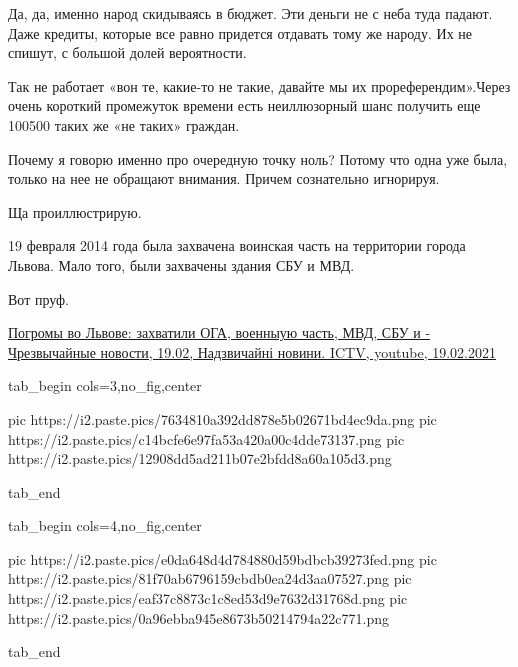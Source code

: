 \begin{multicols}{2}
Да, да, именно народ скидываясь в бюджет. Эти деньги не с неба туда падают.
Даже кредиты, которые все равно придется отдавать тому же народу. Их не спишут,
с большой долей вероятности.

Так не работает «вон те, какие-то не такие, давайте мы их прореферендим».Через
очень короткий промежуток времени есть неиллюзорный шанс получить еще 100500
таких же «не таких» граждан.

Почему я говорю именно про очередную точку ноль? Потому что одна уже была,
только на нее не обращают внимания. Причем сознательно игнорируя.

Ща проиллюстрирую.

19 февраля 2014 года была захвачена воинская часть на территории города Львова.
Мало того, были захвачены здания СБУ и МВД.

Вот пруф.

\end{multicols} %

\href{https://www.youtube.com/watch?v=GQ0Lmm-mTmU}{%
Погромы во Львове: захватили ОГА, военныую часть, МВД, СБУ и - Чрезвычайные новости, 19.02, %
Надзвичайні новини. ICTV, youtube, 19.02.2021
}


\ifcmt
  tab_begin cols=3,no_fig,center

     pic https://i2.paste.pics/7634810a392dd878e5b02671bd4ec9da.png
		 pic https://i2.paste.pics/c14bcfe6e97fa53a420a00c4dde73137.png
		 pic https://i2.paste.pics/12908dd5ad211b07e2bfdd8a60a105d3.png

  tab_end

  tab_begin cols=4,no_fig,center

		 pic https://i2.paste.pics/e0da648d4d784880d59bdbcb39273fed.png
		 pic https://i2.paste.pics/81f70ab6796159cbdb0ea24d3aa07527.png
		 pic https://i2.paste.pics/eaf37c8873c1c8ed53d9e7632d31768d.png
		 pic https://i2.paste.pics/0a96ebba945e8673b50214794a22c771.png

  tab_end
\fi

